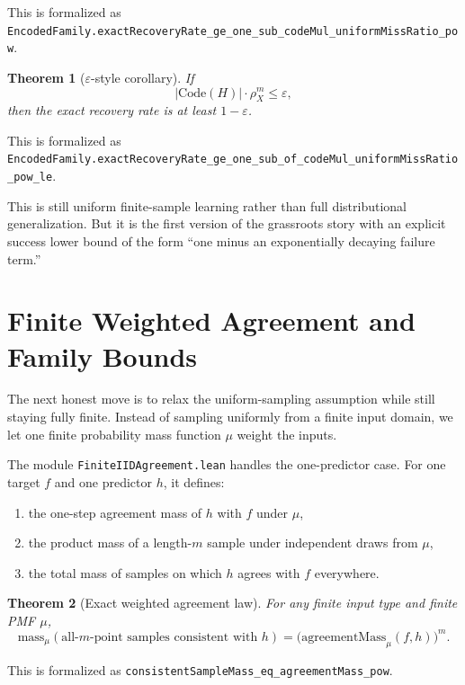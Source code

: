 \documentclass[11pt]{article}
\newtheorem{theorem}{Theorem}[section]
\theoremstyle{remark}
\begin{document}
\noindent
This is formalized as
\texttt{EncodedFamily.exactRecoveryRate\_ge\_one\_sub\_codeMul\_uniformMissRatio\_pow}.

\begin{theorem}[\(\varepsilon\)-style corollary]
If
\[
  |\mathrm{Code}(H)| \cdot \rho_X^m \le \varepsilon,
\]
then the exact recovery rate is at least \(1 - \varepsilon\).
\end{theorem}

\noindent
This is formalized as
\texttt{EncodedFamily.exactRecoveryRate\_ge\_one\_sub\_of\_codeMul\_uniformMissRatio\_pow\_le}.

This is still uniform finite-sample learning rather than full distributional
generalization.  But it is the first version of the grassroots story with an
explicit success lower bound of the form ``one minus an exponentially decaying
failure term.''

\section{Finite Weighted Agreement and Family Bounds}

The next honest move is to relax the uniform-sampling assumption while still
staying fully finite.  Instead of sampling uniformly from a finite input domain,
we let one finite probability mass function \(\mu\) weight the inputs.

The module \texttt{FiniteIIDAgreement.lean} handles the one-predictor case.  For
one target \(f\) and one predictor \(h\), it defines:
\begin{enumerate}[leftmargin=1.5em]
  \item the one-step agreement mass of \(h\) with \(f\) under \(\mu\),
  \item the product mass of a length-\(m\) sample under independent draws from \(\mu\),
  \item the total mass of samples on which \(h\) agrees with \(f\) everywhere.
\end{enumerate}

\begin{theorem}[Exact weighted agreement law]
For any finite input type and finite PMF \(\mu\),
\[
  \mathrm{mass}_{\mu}(\text{all-$m$-point samples consistent with } h)
  =
  \bigl(\mathrm{agreementMass}_{\mu}(f,h)\bigr)^m.
\]
\end{theorem}

\noindent
This is formalized as
\texttt{consistentSampleMass\_eq\_agreementMass\_pow}.
\end{document}
